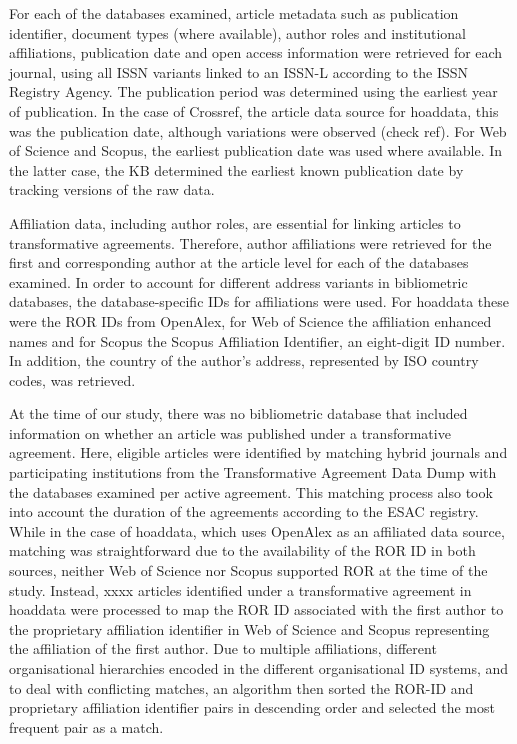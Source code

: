 \documentclass[a4paper,man,floatsintext,longtable,noextraspace,12pt]{apa6}
\begin{document}
For each of the databases examined, article metadata such as publication
identifier, document types (where available), author roles and
institutional affiliations, publication date and open access information
were retrieved for each journal, using all ISSN variants linked to an
ISSN-L according to the ISSN Registry Agency. The publication period was
determined using the earliest year of publication. In the case of
Crossref, the article data source for hoaddata, this was the publication
date, although variations were observed (check ref). For Web of Science
and Scopus, the earliest publication date was used where available. In
the latter case, the KB determined the earliest known publication date
by tracking versions of the raw data.

Affiliation data, including author roles, are essential for linking
articles to transformative agreements. Therefore, author affiliations
were retrieved for the first and corresponding author at the article
level for each of the databases examined. In order to account for
different address variants in bibliometric databases, the
database-specific IDs for affiliations were used. For hoaddata these
were the ROR IDs from OpenAlex, for Web of Science the affiliation
enhanced names and for Scopus the Scopus Affiliation Identifier, an
eight-digit ID number. In addition, the country of the author's address,
represented by ISO country codes, was retrieved.

At the time of our study, there was no bibliometric database that
included information on whether an article was published under a
transformative agreement. Here, eligible articles were identified by
matching hybrid journals and participating institutions from the
Transformative Agreement Data Dump with the databases examined per
active agreement. This matching process also took into account the
duration of the agreements according to the ESAC registry. While in the
case of hoaddata, which uses OpenAlex as an affiliated data source,
matching was straightforward due to the availability of the ROR ID in
both sources, neither Web of Science nor Scopus supported ROR at the
time of the study. Instead, xxxx articles identified under a
transformative agreement in hoaddata were processed to map the ROR ID
associated with the first author to the proprietary affiliation
identifier in Web of Science and Scopus representing the affiliation of
the first author. Due to multiple affiliations, different organisational
hierarchies encoded in the different organisational ID systems, and to
deal with conflicting matches, an algorithm then sorted the ROR-ID and
proprietary affiliation identifier pairs in descending order and
selected the most frequent pair as a match.
\end{document}
